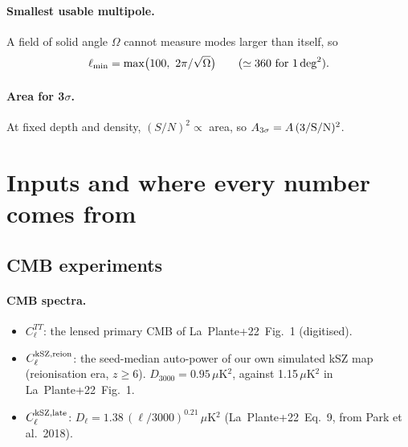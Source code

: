 \documentclass[11pt]{article}
\newcommand{\kSZ}{\mathrm{kSZ}}
\newcommand{\LP}{La~Plante+22}
\begin{document}
\paragraph{Smallest usable multipole.} A field of solid angle $\Omega$ cannot measure modes larger than itself, so
\begin{equation}
\ell_{\min}=\max\bigl(100,\ 2\pi/\sqrt{\Omega}\bigr)\qquad(\simeq 360\ \text{for 1\,deg}^2).
\end{equation}

\paragraph{Area for 3$\sigma$.} At fixed depth and density, $(S/N)^2\propto$ area, so $A_{3\sigma}=A\,(3/{\rm S/N})^2$.

\section{Inputs and where every number comes from}\label{sec:inputs}

\subsection{CMB experiments}
\begin{table}[H]\centering\small
\resizebox{\textwidth}{!}{}
\caption{CMB experiments. $\Delta_T$ and the beam set the instrument-only noise. SO, CMB-S4 and CMB-HD also have La~Plante's post-ILC curves (\LP\ Fig.~1, vector-digitised: \texttt{data/reference/la\_plante\_2022/fig1\_filter\_components\_digitized.csv}). The area is the experiment's sky coverage; what enters $f_{\rm sky}$ is the overlap with the LAE field. CMB-S4: DOE and NSF ended support for the project in July 2025 (CASCA GAC report, Dec.\ 2025); it is kept here only for comparison.}
\label{tab:cmb}
\end{table}

\paragraph{CMB spectra.}
\begin{itemize}
\item $C_\ell^{TT}$: the lensed primary CMB of \LP\ Fig.~1 (digitised).
\item $C_\ell^{\kSZ,{\rm reion}}$: the seed-median auto-power of our own simulated kSZ map (reionisation era, $z\ge6$). $D_{3000}=0.95\,\mu$K$^2$, against 1.15\,$\mu$K$^2$ in \LP\ Fig.~1.
\item $C_\ell^{\kSZ,{\rm late}}$: $D_\ell = 1.38\,(\ell/3000)^{0.21}\,\mu$K$^2$ (\LP\ Eq.~9, from Park et al.\ 2018).
\end{itemize}
\end{document}
